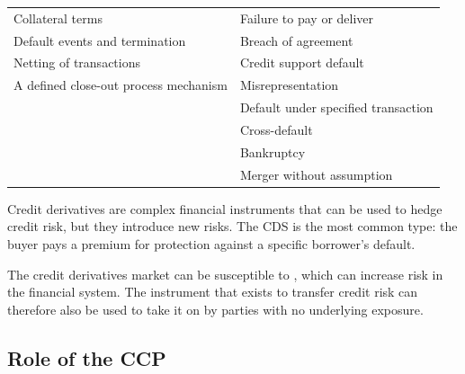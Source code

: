 \begin{center}
\footnotesize
\begin{tabular}{L{7.0cm} L{7.5cm}}
\toprule
{} &  \\
\midrule
Collateral terms & Failure to pay or deliver \\
Default events and termination & Breach of agreement \\
Netting of transactions & Credit support default \\
A defined close-out process mechanism & Misrepresentation \\
 & Default under specified transaction \\
 & Cross-default \\
 & Bankruptcy \\
 & Merger without assumption \\
\bottomrule
\end{tabular}
\end{center}


Credit derivatives are complex financial instruments that can be used to hedge
credit risk, but they introduce new risks. The CDS is the most common type: the
buyer pays a premium for protection against a specific borrower's default.

\begin{crtrapbox}
The credit derivatives market can be susceptible to , which can
increase risk in the financial system. The instrument that exists to transfer
credit risk can therefore also be used to take it on by parties with no
underlying exposure.
\end{crtrapbox}


\subsection*{Role of the CCP}

